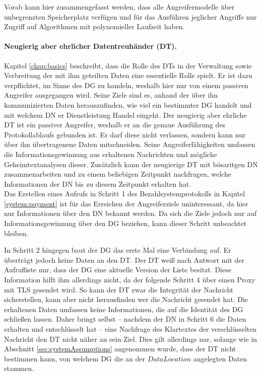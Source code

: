 \documentclass[
	fontsize=11pt,
	headings=small,
	parskip=half,           %
	bibliography=totoc,
	numbers=noenddot,       %
	open=any,               %
]{scrreprt}
\begin{document}
Vorab kann hier zusammengefasst werden, dass alle Angreifermodelle über unbegrenzten Speicherplatz verfügen und für das Ausführen jeglicher Angriffe nur Zugriff auf Algorithmen mit polynomieller Laufzeit haben.


\paragraph{Neugierig aber ehrlicher Datentreuhänder (DT).}
Kapitel \ref{chap:basics} beschreibt, dass die Rolle des DTs in der Verwaltung sowie Verbreitung der mit ihm geteilten Daten eine essentielle Rolle spielt.  Er ist dazu verpflichtet, im Sinne des DG zu handeln, weshalb hier nur von einem passiven Angreifer ausgegangen wird. Seine Ziele sind es, anhand der über ihn kommunizierten Daten herauszufinden, wie viel ein bestimmter DG handelt und mit welchem DN er Dienstleistung Handel eingeht. Der neugierig aber ehrliche DT ist ein passiver Angreifer, weshalb er an die genaue Ausführung des Protokollablaufs gebunden ist. Er darf diese nicht verlassen, sondern kann nur über ihn übertragenene Daten mitschneiden. Seine Angreiferfähigkeiten umfassen die Informationsgewinnung aus erhaltenen Nachrichten und mögliche Geheimtextanalysen dieser. Zusätzlich kann der neugierige DT mit bösaritgen DN zusammenarbeiten und zu einem beliebigen Zeitpunkt nachfragen, welche Informationen der DN bis zu diesem Zeitpunkt erhalten hat.\\

Das Erstellen eines Aufrufs in Schritt 1 des Bezahlsystemprotokolls in Kapitel \ref{system:payment} ist für das Erreichen der Angreiferziele uninteressant, da hier nur Informationen über den DN bekannt werden. Da sich die Ziele jedoch nur auf Informationsgewinnung über den DG beziehen, kann dieser Schritt unbeachtet bleiben. 

In Schritt 2 hingegen baut der DG das erste Mal eine Verbindung auf. Er überträgt jedoch keine Daten an den DT. Der DT weiß nach Antwort mit der Aufrufliste nur, dass der DG eine aktuelle Version der Liste besitzt. Diese Information hilft ihm allerdings nicht, da der folgende Schritt 4 über einen Proxy mit TLS gesendet wird. So kann der DT zwar die Integrität der Nachricht sicherstellen, kann aber nicht herausfinden wer die Nachricht gesendet hat. Die erhaltenen Daten umfassen keine Informationen, die auf die Identität des DG schließen lassen. Daher bringt selbst -- nachdem der DN in Schritt 6 die Daten erhalten und entschlüsselt hat -- eine Nachfrage des Klartextes der verschlüsselten Nachricht den DT nicht näher an sein Ziel. Dies gilt allerdings nur, solange wie in Abschnitt \ref{sec:systemAssumptions} angenommen wurde, dass der DT  nicht bestimmen kann, von welchem DG die an der $DataLocation$ angelegten Daten stammen.
\end{document}
